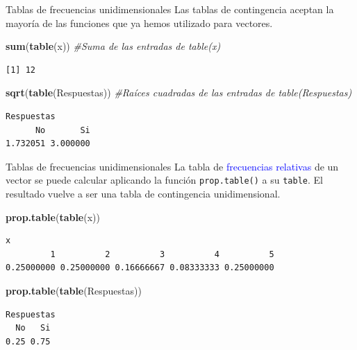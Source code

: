 \documentclass[
  ignorenonframetext,
]{beamer}
\newenvironment{Shaded}{\begin{snugshade}}{\end{snugshade}}
\newcommand{\CommentTok}[1]{\textcolor[rgb]{0.56,0.35,0.01}{\textit{#1}}}
\newcommand{\FunctionTok}[1]{\textcolor[rgb]{0.13,0.29,0.53}{\textbf{#1}}}
\newcommand{\NormalTok}[1]{#1}
\newcommand\blue[1]{\textcolor{blue}{#1}}
\begin{document}
\begin{frame}[fragile]{Tablas de frecuencias unidimensionales}
\label{tablas-de-frecuencias-unidimensionales-7}
Las tablas de contingencia aceptan la mayoría de las funciones que ya
hemos utilizado para vectores.

\begin{Shaded}
\begin{Highlighting}[]
\FunctionTok{sum}\NormalTok{(}\FunctionTok{table}\NormalTok{(x)) }\CommentTok{\#Suma de las entradas de table(x)}
\end{Highlighting}
\end{Shaded}

\begin{verbatim}
[1] 12
\end{verbatim}

\begin{Shaded}
\begin{Highlighting}[]
\FunctionTok{sqrt}\NormalTok{(}\FunctionTok{table}\NormalTok{(Respuestas)) }\CommentTok{\#Raíces cuadradas de las entradas de table(Respuestas)}
\end{Highlighting}
\end{Shaded}

\begin{verbatim}
Respuestas
      No       Si 
1.732051 3.000000 
\end{verbatim}
\end{frame}

\begin{frame}[fragile]{Tablas de frecuencias unidimensionales}
\label{tablas-de-frecuencias-unidimensionales-8}
La tabla de \blue{frecuencias relativas} de un vector se puede calcular
aplicando la función \texttt{prop.table()} a su \texttt{table}. El
resultado vuelve a ser una tabla de contingencia unidimensional.

\begin{Shaded}
\begin{Highlighting}[]
\FunctionTok{prop.table}\NormalTok{(}\FunctionTok{table}\NormalTok{(x))}
\end{Highlighting}
\end{Shaded}

\begin{verbatim}
x
         1          2          3          4          5 
0.25000000 0.25000000 0.16666667 0.08333333 0.25000000 
\end{verbatim}

\begin{Shaded}
\begin{Highlighting}[]
\FunctionTok{prop.table}\NormalTok{(}\FunctionTok{table}\NormalTok{(Respuestas))}
\end{Highlighting}
\end{Shaded}

\begin{verbatim}
Respuestas
  No   Si 
0.25 0.75 
\end{verbatim}
\end{frame}
\end{document}
